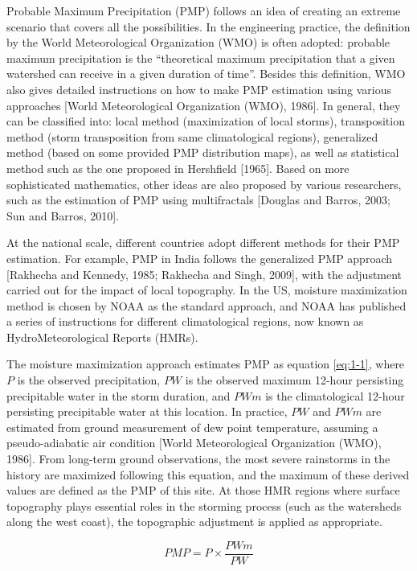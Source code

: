 Probable Maximum Precipitation (PMP) follows an idea of creating an extreme scenario that covers all the possibilities. In the engineering practice, the definition by the World Meteorological Organization (WMO) is often adopted: probable maximum precipitation is the ``theoretical maximum precipitation that a given watershed can receive in a given duration of time''. Besides this definition, WMO also gives detailed instructions on how to make PMP estimation using various approaches [World Meteorological Organization (WMO), 1986]. In general, they can be classified into: local method (maximization of local storms), transposition method (storm transposition from same climatological regions), generalized method (based on some provided PMP distribution maps), as well as statistical method such as the one proposed in Hershfield [1965]. Based on more sophisticated mathematics, other ideas are also proposed by various researchers, such as the estimation of PMP using multifractals [Douglas and Barros, 2003; Sun and Barros, 2010]. 

At the national scale, different countries adopt different methods for their PMP estimation. For example, PMP in India follows the generalized PMP approach [Rakhecha and Kennedy, 1985; Rakhecha and Singh, 2009], with the adjustment carried out for the impact of local topography. In the US, moisture maximization method is chosen by NOAA as the standard approach, and NOAA has published a series of instructions for different climatological regions, now known as HydroMeteorological Reports (HMRs).

The moisture maximization approach estimates PMP as equation \ref{eq:1-1}, where $P$ is the observed precipitation, $PW$ is the observed maximum 12-hour persisting precipitable water in the storm duration, and $PWm$ is the climatological 12-hour persisting precipitable water at this location. In practice, $PW$ and $PWm$ are estimated from ground measurement of dew point temperature, assuming a pseudo-adiabatic air condition [World Meteorological Organization (WMO), 1986]. From long-term ground observations, the most severe rainstorms in the history are maximized following this equation, and the maximum of these derived values are defined as the PMP of this site. At those HMR regions where surface topography plays essential roles in the storming process (such as the watersheds along the west coast), the topographic adjustment is applied as appropriate.

\begin{equation}
	PMP = P \times{\frac{PWm}{PW}}
	\label{eq:1-1}
\end{equation}

